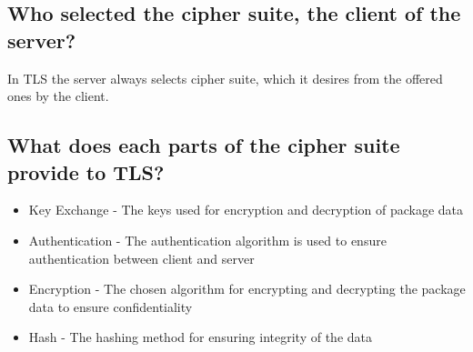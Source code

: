 \documentclass[12pt, a4paper]{article}
\begin{document}
		\subsection{Who selected the cipher suite, the client of the server?}
			In TLS the server always selects cipher suite, which it desires from the offered ones by the client.
		\subsection{What does each parts of the cipher suite provide to TLS?}
			\begin{itemize}
				\item Key Exchange - The keys used for encryption and decryption of package data
				\item Authentication - The authentication algorithm is used to ensure authentication between client and server
				\item Encryption - The chosen algorithm for encrypting and decrypting the package data to ensure confidentiality
				\item Hash - The hashing method for ensuring integrity of the data
			\end{itemize}
			
\end{document}
